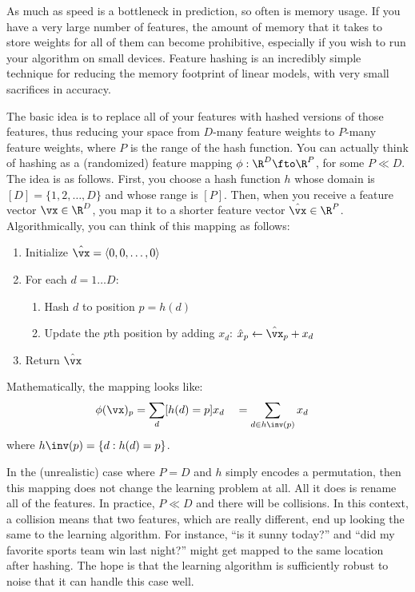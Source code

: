 As much as speed is a bottleneck in prediction, so often is memory
usage.  If you have a very large number of features, the amount of
memory that it takes to store weights for all of them can become
prohibitive, especially if you wish to run your algorithm on small
devices.  Feature hashing is an incredibly simple technique for
reducing the memory footprint of linear models, with very small
sacrifices in accuracy.

The basic idea is to replace all of your features with hashed versions
of those features, thus reducing your space from $D$-many feature
weights to $P$-many feature weights, where $P$ is the range of the
hash function.  You can actually think of hashing as a (randomized)
feature mapping $\phi : \R^D \fto \R^P$, for some $P \ll D$.  The idea
is as follows.  First, you choose a hash function $h$ whose domain is
$[D] = \{ 1, 2, \dots, D \}$ and whose range is $[P]$.  Then, when you
receive a feature vector $\vx \in \R^D$, you map it to a shorter
feature vector $\hat\vx \in \R^P$.  Algorithmically, you can think of
this mapping as follows:

\begin{enumerate}
  \item Initialize $\hat\vx = \langle 0, 0, \dots, 0 \rangle$
  \item For each $d = 1 \dots D$:
    \begin{enumerate}
      \item Hash $d$ to position $p = h(d)$
      \item Update the $p$th position by adding $x_d$: $\hat x_p \leftarrow \hat\vx_p + x_d$
    \end{enumerate}
  \item Return $\hat\vx$
\end{enumerate}

\noindent
Mathematically, the mapping looks like:
%
\begin{align}
  \phi(\vx)_p
  &= \sum_d [h(d) = p] x_d
  \quad= \sum_{d \in h\inv(p)} x_d
\end{align}
%
where $h\inv(p) = \{ d : h(d) = p \}$.

In the (unrealistic) case where $P = D$ and $h$ simply encodes a
permutation, then this mapping does not change the learning problem at
all.  All it does is rename all of the features.  In practice, $P \ll
D$ and there will be collisions.  In this context, a collision means
that two features, which are really different, end up looking the same
to the learning algorithm.  For instance, ``is it sunny today?'' and
``did my favorite sports team win last night?'' might get mapped to
the same location after hashing.  The hope is that the learning
algorithm is sufficiently robust to noise that it can handle this case
well.

